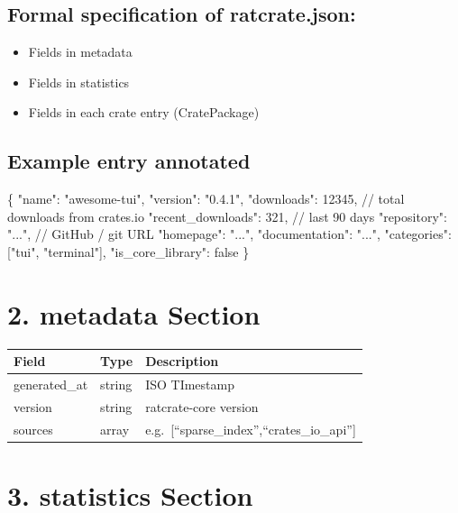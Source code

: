 \documentclass[
  letterpaper,
  DIV=11,
  numbers=noendperiod]{scrreprt}
\newenvironment{Shaded}{\begin{snugshade}}{\end{snugshade}}
\newcommand{\NormalTok}[1]{\textcolor[rgb]{0.00,0.23,0.31}{#1}}
\providecommand{\tightlist}{%
  \setlength{\itemsep}{0pt}\setlength{\parskip}{0pt}}
\begin{document}
\section{Formal specification of
ratcrate.json:}\label{formal-specification-of-ratcrate.json}

\begin{itemize}
\tightlist
\item
  Fields in metadata
\item
  Fields in statistics
\item
  Fields in each crate entry (CratePackage)
\end{itemize}

\section{Example entry annotated}\label{example-entry-annotated}

\begin{Shaded}
\begin{Highlighting}[]

\NormalTok{\{}
\NormalTok{  "name": "awesome{-}tui",}
\NormalTok{  "version": "0.4.1",}
\NormalTok{  "downloads": 12345,        // total downloads from crates.io}
\NormalTok{  "recent\_downloads": 321,   // last 90 days}
\NormalTok{  "repository": "...",       // GitHub / git URL}
\NormalTok{  "homepage": "...",}
\NormalTok{  "documentation": "...",}
\NormalTok{  "categories": ["tui", "terminal"],}
\NormalTok{  "is\_core\_library": false}
\NormalTok{\}}
\end{Highlighting}
\end{Shaded}

\chapter{2. metadata Section}\label{metadata-section}

\begin{longtable}[]{@{}lll@{}}
\toprule\noalign{}
Field & Type & Description \\
\midrule\noalign{}
\endhead
\bottomrule\noalign{}
\endlastfoot
generated\_at & string & ISO TImestamp \\
version & string & ratcrate-core version \\
sources & array & e.g.~{[}``sparse\_index'',``crates\_io\_api''{]} \\
\end{longtable}

\chapter{3. statistics Section}\label{statistics-section}
\end{document}
